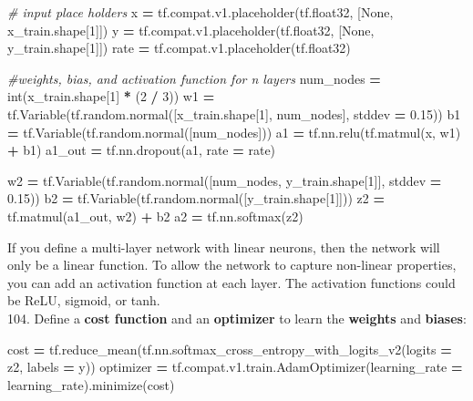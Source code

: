 \documentclass[]{book}
\newenvironment{Shaded}{\begin{snugshade}}{\end{snugshade}}
\newcommand{\DecValTok}[1]{\textcolor[rgb]{0.00,0.00,0.81}{#1}}
\newcommand{\FloatTok}[1]{\textcolor[rgb]{0.00,0.00,0.81}{#1}}
\newcommand{\CommentTok}[1]{\textcolor[rgb]{0.56,0.35,0.01}{\textit{#1}}}
\newcommand{\VariableTok}[1]{\textcolor[rgb]{0.00,0.00,0.00}{#1}}
\newcommand{\OperatorTok}[1]{\textcolor[rgb]{0.81,0.36,0.00}{\textbf{#1}}}
\newcommand{\BuiltInTok}[1]{#1}
\newcommand{\NormalTok}[1]{#1}
\begin{document}
\begin{Shaded}
\begin{Highlighting}[]
\CommentTok{# input place holders}
\NormalTok{x }\OperatorTok{=}\NormalTok{ tf.compat.v1.placeholder(tf.float32, [}\VariableTok{None}\NormalTok{, x_train.shape[}\DecValTok{1}\NormalTok{]])}
\NormalTok{y }\OperatorTok{=}\NormalTok{ tf.compat.v1.placeholder(tf.float32, [}\VariableTok{None}\NormalTok{, y_train.shape[}\DecValTok{1}\NormalTok{]])}
\NormalTok{rate }\OperatorTok{=}\NormalTok{ tf.compat.v1.placeholder(tf.float32)}

\CommentTok{#weights, bias, and activation function for n layers}
\NormalTok{num_nodes }\OperatorTok{=} \BuiltInTok{int}\NormalTok{(x_train.shape[}\DecValTok{1}\NormalTok{] }\OperatorTok{*}\NormalTok{ (}\DecValTok{2} \OperatorTok{/} \DecValTok{3}\NormalTok{))}
\NormalTok{w1 }\OperatorTok{=}\NormalTok{ tf.Variable(tf.random.normal([x_train.shape[}\DecValTok{1}\NormalTok{], num_nodes], stddev }\OperatorTok{=} \FloatTok{0.15}\NormalTok{))}
\NormalTok{b1 }\OperatorTok{=}\NormalTok{ tf.Variable(tf.random.normal([num_nodes]))}
\NormalTok{a1 }\OperatorTok{=}\NormalTok{ tf.nn.relu(tf.matmul(x, w1) }\OperatorTok{+}\NormalTok{ b1)}
\NormalTok{a1_out }\OperatorTok{=}\NormalTok{ tf.nn.dropout(a1, rate }\OperatorTok{=}\NormalTok{ rate)}

\NormalTok{w2 }\OperatorTok{=}\NormalTok{ tf.Variable(tf.random.normal([num_nodes, y_train.shape[}\DecValTok{1}\NormalTok{]], stddev }\OperatorTok{=} \FloatTok{0.15}\NormalTok{))}
\NormalTok{b2 }\OperatorTok{=}\NormalTok{ tf.Variable(tf.random.normal([y_train.shape[}\DecValTok{1}\NormalTok{]]))}
\NormalTok{z2 }\OperatorTok{=}\NormalTok{ tf.matmul(a1_out, w2) }\OperatorTok{+}\NormalTok{ b2}
\NormalTok{a2 }\OperatorTok{=}\NormalTok{ tf.nn.softmax(z2)}
\end{Highlighting}
\end{Shaded}

If you define a multi-layer network with linear neurons, then the network will only be a linear function. To allow the network to capture non-linear properties, you can add an activation function at each layer. The activation functions could be ReLU, sigmoid, or tanh.\\
104. Define a \textbf{cost function} and an \textbf{optimizer} to learn the \textbf{weights} and \textbf{biases}:

\begin{Shaded}
\begin{Highlighting}[]
\NormalTok{cost }\OperatorTok{=}\NormalTok{ tf.reduce_mean(tf.nn.softmax_cross_entropy_with_logits_v2(logits }\OperatorTok{=}\NormalTok{ z2, labels }\OperatorTok{=}\NormalTok{ y))}
\NormalTok{optimizer }\OperatorTok{=}\NormalTok{ tf.compat.v1.train.AdamOptimizer(learning_rate }\OperatorTok{=}\NormalTok{ learning_rate).minimize(cost)}
\end{Highlighting}
\end{Shaded}
\end{document}
